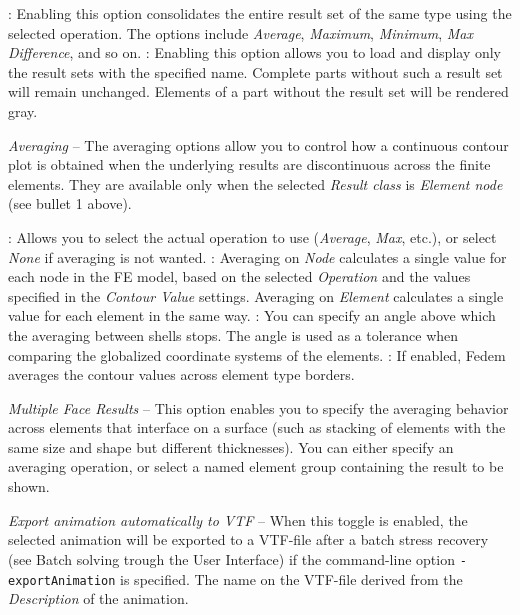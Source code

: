 \begin{bulletlist}
  \begin{itemize}
   :
    Enabling this option consolidates the entire result set of the same type
    using the selected operation. The options include {\sl Average},
    {\sl Maximum}, {\sl Minimum}, {\sl Max Difference}, and so on.
   :
    Enabling this option allows you to load and display only the result sets
    with the specified name.
    Complete parts without such a result set will remain unchanged.
    Elements of a part without the result set will be rendered gray.
  \end{itemize}

\item{\sl Averaging} --
  The averaging options allow you to control how a continuous contour plot is
  obtained when the underlying results are discontinuous across the finite
  elements. They are available only when the selected {\sl Result class} is
  {\sl Element node} (see bullet 1 above).

  \begin{itemize}
   :
    Allows you to select the actual operation to use ({\sl Average}, {\sl Max},
    etc.), or select {\sl None} if averaging is not wanted.
   :
    Averaging on {\sl Node} calculates a single value for each node in the
    FE model, based on the selected {\sl Operation} and the values specified
    in the {\sl Contour Value} settings. Averaging on {\sl Element} calculates
    a single value for each element in the same way.
   :
    You can specify an angle above which the averaging between shells stops.
    The angle is used as a tolerance when comparing the globalized coordinate
    systems of the elements.
   :
    If enabled, Fedem averages the contour values across element type borders.
  \end{itemize}

\item{\sl Multiple Face Results} --
  This option enables you to specify the averaging behavior across elements
  that interface on a surface (such as stacking of elements with the same size
  and shape but different thicknesses). You can either specify an averaging
  operation, or select a named element group containing the result to be shown.


\item{\sl Export animation automatically to VTF} --
  When this toggle is enabled, the selected animation will be exported to a
  VTF-file after a batch stress recovery (see
             {Batch solving trough the User Interface})
  if the command-line option {\tt-exportAnimation} is specified.
  The name on the VTF-file derived from the {\sl Description} of the animation.
\end{bulletlist}

